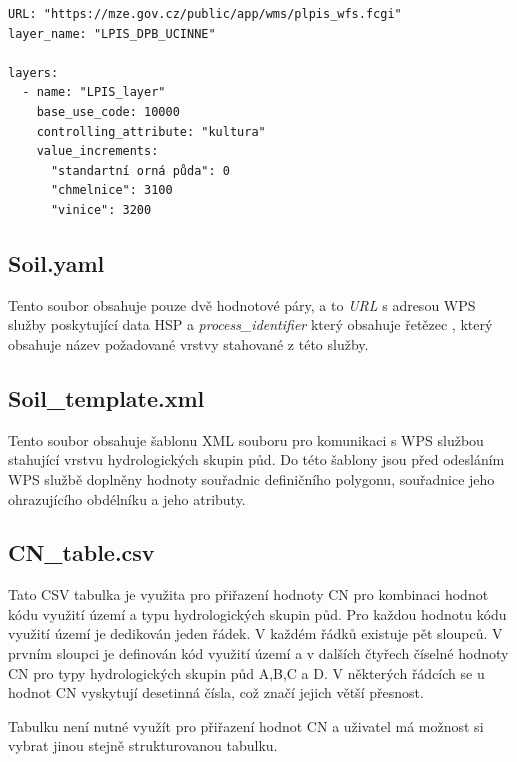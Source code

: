 \documentclass[a4paper,oneside,12pt]{book}
\begin{document}
\begin{lstlisting}[style=myyaml, caption={Ukázka LPIS.yaml},label={kod:LPIS.yaml}]
URL: "https://mze.gov.cz/public/app/wms/plpis_wfs.fcgi"
layer_name: "LPIS_DPB_UCINNE"

layers:
  - name: "LPIS_layer"
    base_use_code: 10000
    controlling_attribute: "kultura"
    value_increments:
      "standartní orná půda": 0
      "chmelnice": 3100
      "vinice": 3200
\end{lstlisting}

\subsection{Soil.yaml} \label{Soil.yaml}
Tento soubor obsahuje pouze dvě hodnotové páry, a to \textit{URL} s adresou WPS služby poskytující data HSP a \textit{process\_identifier} který obsahuje řetězec , který obsahuje název požadované vrstvy stahované z této služby.


\subsection{Soil\_template.xml} \label{Soil_template.xml}
\hspace{10mm} Tento soubor obsahuje šablonu XML souboru pro komunikaci s WPS službou stahující vrstvu hydrologických skupin půd.
Do této šablony jsou před odesláním WPS službě doplněny hodnoty souřadnic definičního polygonu, souřadnice jeho ohrazujícího obdélníku a jeho atributy.

\subsection{CN\_table.csv} \label{CN_table.csv}
\hspace{10mm} Tato CSV tabulka je využita pro přiřazení hodnoty CN pro kombinaci hodnot kódu využití území a typu hydrologických skupin půd. Pro každou hodnotu kódu využití území je dedikován jeden řádek. V každém řádků existuje pět sloupců. V prvním sloupci je definován kód využití území a v dalších čtyřech číselné hodnoty CN pro typy hydrologických skupin půd A,B,C a D. V některých řádcích se u hodnot CN vyskytují desetinná čísla, což značí jejich větší přesnost.

\hspace{10mm} Tabulku není nutné využít pro přiřazení hodnot CN a uživatel má možnost si vybrat jinou stejně strukturovanou tabulku.

\end{document}
